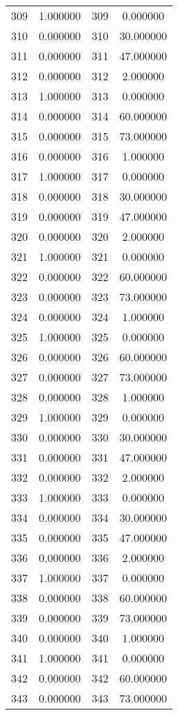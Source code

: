 \documentclass[12pt]{article}
\begin{document}
\begin{longtable}{@{}cccc@{}}
309 & 1.000000 & 309 & 0.000000 \\
310 & 0.000000 & 310 & 30.000000 \\
311 & 0.000000 & 311 & 47.000000 \\
312 & 0.000000 & 312 & 2.000000 \\
313 & 1.000000 & 313 & 0.000000 \\
314 & 0.000000 & 314 & 60.000000 \\
315 & 0.000000 & 315 & 73.000000 \\
316 & 0.000000 & 316 & 1.000000 \\
317 & 1.000000 & 317 & 0.000000 \\
318 & 0.000000 & 318 & 30.000000 \\
319 & 0.000000 & 319 & 47.000000 \\
320 & 0.000000 & 320 & 2.000000 \\
321 & 1.000000 & 321 & 0.000000 \\
322 & 0.000000 & 322 & 60.000000 \\
323 & 0.000000 & 323 & 73.000000 \\
324 & 0.000000 & 324 & 1.000000 \\
325 & 1.000000 & 325 & 0.000000 \\
326 & 0.000000 & 326 & 60.000000 \\
327 & 0.000000 & 327 & 73.000000 \\
328 & 0.000000 & 328 & 1.000000 \\
329 & 1.000000 & 329 & 0.000000 \\
330 & 0.000000 & 330 & 30.000000 \\
331 & 0.000000 & 331 & 47.000000 \\
332 & 0.000000 & 332 & 2.000000 \\
333 & 1.000000 & 333 & 0.000000 \\
334 & 0.000000 & 334 & 30.000000 \\
335 & 0.000000 & 335 & 47.000000 \\
336 & 0.000000 & 336 & 2.000000 \\
337 & 1.000000 & 337 & 0.000000 \\
338 & 0.000000 & 338 & 60.000000 \\
339 & 0.000000 & 339 & 73.000000 \\
340 & 0.000000 & 340 & 1.000000 \\
341 & 1.000000 & 341 & 0.000000 \\
342 & 0.000000 & 342 & 60.000000 \\
343 & 0.000000 & 343 & 73.000000 \\

\end{longtable}
\end{document}
